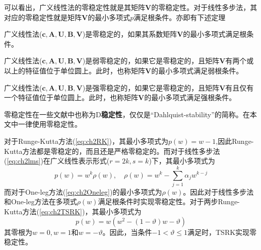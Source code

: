 可以看出，广义线性法的零稳定性就是其矩阵$\bm{V}$的零稳定性。对于线性多步法，其对应的零稳定性就是矩阵$\bm{V}$的最小多项式$p$满足根条件。亦即有下述定理
\begin{theorem}[零稳定性的等价转述]
广义线性法($\bm{c},\bm{A},\bm{U},\bm{B},\bm{V}$)是零稳定的\cite{Jackiewicz2009a}，如果其系数矩阵$\bm{V}$的最小多项式满足根条件。
\end{theorem}
\begin{definition}[弱零稳定性]
广义线性法($\bm{c},\bm{A},\bm{U},\bm{B},\bm{V}$)是弱零稳定的\cite{Gear1971c}，如果它是零稳定的，且矩阵$\bm{V}$有两个或以上的特征值位于单位圆上。此时，也称矩阵$\bm{V}$的最小多项式满足弱根条件。
\end{definition}
\begin{definition}[强零稳定性]
广义线性法($\bm{c},\bm{A},\bm{U},\bm{B},\bm{V}$)是强零稳定的\cite{Jackiewicz2009a,LiShouFo2010a,Gear1971c}，如果它是零稳定的，且矩阵$\bm{V}$有且仅有一个特征值位于单位圆上。此时，也称矩阵$\bm{V}$的最小多项式满足强根条件。
\end{definition}%

零稳定性在一些文献中也称为D\textbf{稳定性}，仅仅是“Dahlquist-stability”的简称。在本文中一律使用零稳定性。

对于Runge-Kutta方法(\ref{eq:ch2RK})，其最小多项式为$p(w)=w-1$,因此Runge-Kutta方法都是零稳定的，而且还是严格零稳定的。而对于线性多步法(\ref{eq:ch2lms})在广义线性表示形式($r=2k,s=k$)下，其最小多项式为
\begin{equation}
p(w)=w^k\rho(w),\quad \rho(w)=w^k-\sum_{j=1}^{k}\alpha_jw^{k-j}
\end{equation}
而对于One-leg方法(\ref{eq:ch2Oneleg})的最小多项式为$\rho(w)$。因此对于线性多步法和One-leg方法在多项式$\rho(w)$满足根条件时实现零稳定性。对于两步Runge-Kutta方法(\ref{eq:ch2TSRK})，其最小多项式为
\begin{equation}
p(w)=w(w^2-(1-\vartheta)w-\vartheta)
\end{equation}
其零根为$w=0,w=1$和$w=-\vartheta$。因此，当条件$-1<\vartheta\le1$满足时，TSRK实现零稳定性。

